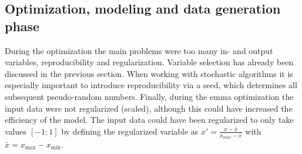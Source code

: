 \subsection{Optimization, modeling and data generation phase}
\label{sec:phase3}
During the optimization the main problems were too many in- and output variables, reproducibility and regularization. 
Variable selection has already been discussed in the previous section. 
When working with stochastic algorithms it is especially important to introduce reproducibility via a seed, which determines all subsequent pseudo-random numbers. 
Finally, during the \gls{emma} optimization the input data were not regularized (scaled), %
although this could have increased the efficiency of the model.
%
The input data could have been regularized to only take values $[-1;1]$ by defining the regularized variable as 
$x'= \frac{x-\bar{x}}{x_{max} - \bar{x}}$ with $\bar{x}= x_{\text{max}} - x_{\text{min}}$.
\iffalse
\begin{itemize}
    \item regularization
    \item reproducability (random in code and repeat sample)
    \item main problems too many in and output vars
\end{itemize}
\fi
\iffalse
